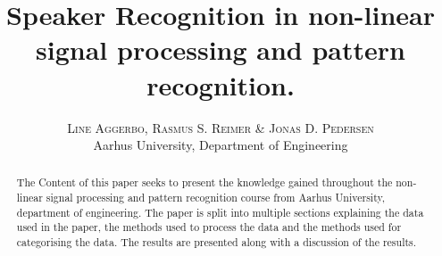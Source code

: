 

\title{
	\vspace{-15mm}
	\fontsize{24pt}{10pt}
	\selectfont
	\textbf{Speaker Recognition in non-linear signal processing and pattern recognition.
	}
}

\author{
	\large
	\textsc{Line Aggerbo, Rasmus S. Reimer \& Jonas D. Pedersen}\\[2mm]
	\normalsize Aarhus University, Department of Engineering \\
	\vspace{-5mm}
}
\date{}




\maketitle
\thispagestyle{fancy} %
\raggedright



\begin{abstract}
The Content of this paper seeks to present the knowledge gained throughout the non-linear signal processing and pattern recognition course from Aarhus University, department of engineering. The paper is split into multiple sections explaining the data used in the paper, the methods used to process the data and the methods used for categorising the data. The results are presented along with a discussion of the results. 
\end{abstract}






\begingroup
	\raggedright
	
\endgroup


